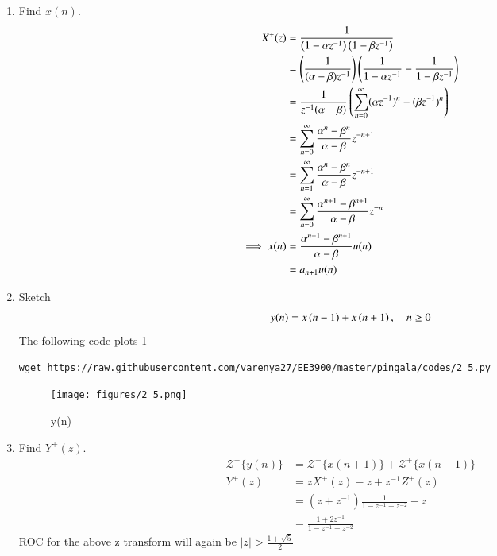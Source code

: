 \documentclass[journal,12pt,twocolumn]{IEEEtran}
\renewcommand\thesection{\arabic{section}}
\begin{document}
\begin{enumerate}[label=\thesection.\arabic*,ref=\thesection.\theenumi]
	\item Find $x(n)$.
	\begin{align}
	    X^{+}(z)    &= \frac{1}{\left(1-\alpha z^{-1}\right) \left(1-\beta z^{-1}\right)}\\
	    &=\left(\frac{1}{(\alpha-\beta)z^{-1}}\right)\left(\frac{1}{1-\alpha z^{-1}} - \frac{1}{1-\beta z^{-1}} \right)\\
	    &=\frac{1}{z^{-1}(\alpha-\beta)}\left(\sum_{n=0}^\infty (\alpha z^{-1})^n-(\beta z^{-1})^n \right)\\
	    &= \sum_{n=0}^\infty \frac{\alpha^n-\beta^n}{\alpha-\beta}z^{-n+1}\\
	    &= \sum_{n=1}^\infty \frac{\alpha^n-\beta^n}{\alpha-\beta}z^{-n+1}\\
	    &= \sum_{n=0}^\infty \frac{\alpha^{n+1}-\beta^{n+1}}{\alpha-\beta}z^{-n}\\
	    \implies x(n) &= \frac{\alpha^{n+1}-\beta^{n+1}}{\alpha-\beta}u(n)\\
	    &=a_{n+1}u(n)\label{eq:xn}
	\end{align}
	\item Sketch 
\begin{align}
	y(n)	 = x\left(n-1\right) + x\left(n+1\right),  \quad n \ge 0
	\label{eq:10-orig-diff-rev}
\end{align}
 \solution The following code plots \ref{fig:yn}
	    \begin{lstlisting}
wget https://raw.githubusercontent.com/varenya27/EE3900/master/pingala/codes/2_5.py
\end{lstlisting}
\begin{figure}
    \centering
    \texttt{[image: figures/2\_5.png]}
    \caption{y(n)}
    \label{fig:yn}
\end{figure}
\item Find $Y^{+}(z)$. \\
\solution \begin{align}
    \mathcal{Z}^+\{y(n)\} &= \mathcal{Z}^+\{x(n+1)\}+\mathcal{Z}^+\{x(n-1)\}\\
    Y^+(z) &= zX^+(z)-z+z^{-1}Z^+(z)\\
    &= (z+z^{-1})\frac{1}{1-z^{-1}-z^{-2}}-z\\
    &= \frac{1+2z^{-1}}{1-z^{-1}-z^{-2}}
\end{align}
ROC for the above z transform will again be $|z|>\frac{1+\sqrt{5}}{2}$


\end{enumerate}
\end{document}
